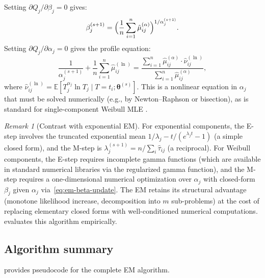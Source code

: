 \documentclass[12pt]{article}
\theoremstyle{definition}
\theoremstyle{remark}
\newtheorem{remark}[theorem]{Remark}
\newcommand{\E}{\mathbb{E}}
\newcommand{\btheta}{\bm{\theta}}
\begin{document}
Setting $\partial Q_j / \partial \beta_j = 0$ gives:
\begin{equation}\label{eq:em-beta-update}
  \beta_j^{(s+1)} = \Bigl(
    \frac{1}{n} \sum_{i=1}^n \hat\mu_{ij}^{(\alpha)}
  \Bigr)^{1/\alpha_j^{(s+1)}}.
\end{equation}
Setting $\partial Q_j / \partial \alpha_j = 0$ gives the
profile equation:
\begin{equation}\label{eq:em-alpha-profile}
  \frac{1}{\alpha_j^{(s+1)}}
  + \frac{1}{n} \sum_{i=1}^n \hat\mu_{ij}^{(\ln)}
  = \frac{\sum_{i=1}^n \hat\mu_{ij}^{(\alpha)}
    \cdot \hat\nu_{ij}^{(\ln)}}
   {\sum_{i=1}^n \hat\mu_{ij}^{(\alpha)}},
\end{equation}
where
$\hat\nu_{ij}^{(\ln)} = \E[T_j^{\alpha_j} \ln T_j \mid T = t_i;
\btheta^{(s)}]$.  This is a nonlinear equation in $\alpha_j$ that
must be solved numerically (e.g., by Newton--Raphson or bisection),
as is standard for single-component Weibull MLE
\citep{Cohen1965, LawlessBook2003}.

\begin{remark}[Contrast with exponential EM]
For exponential components, the E-step involves the truncated
exponential mean $1/\lambda_j - t/(e^{\lambda_j t} - 1)$ (a
simple closed form), and the M-step is $\lambda_j^{(s+1)} = n /
\sum_i \hat\tau_{ij}$ (a reciprocal).  For Weibull components, the
E-step requires incomplete gamma functions (which are available
in standard numerical libraries via the regularized gamma function),
and the M-step requires a one-dimensional numerical optimization
over $\alpha_j$ with closed-form $\beta_j$ given $\alpha_j$
via~\eqref{eq:em-beta-update}.  The EM retains its structural
advantage (monotone likelihood increase, decomposition into $m$
sub-problems) at the cost of replacing elementary closed forms
with well-conditioned numerical computations.
 evaluates this algorithm empirically.
\end{remark}

\subsection{Algorithm summary}

 provides pseudocode for the complete EM
algorithm.
\end{document}
